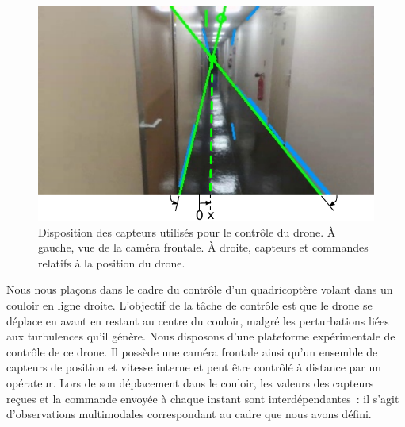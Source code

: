 \documentclass[../main]{subfiles}
\begin{document}
\begin{figure}
	\centering\includegraphics[width=\textwidth]{visudrone.pdf}
	\caption{Disposition des capteurs utilisés pour le contrôle du drone. \`A gauche, vue de la caméra frontale. \`A droite, capteurs et commandes relatifs à la position du drone.}
	\label{fig:drone}
	\end{figure}

Nous nous plaçons dans le cadre du contrôle d'un quadricoptère volant dans un couloir en ligne droite.
L'objectif de la tâche de contrôle est que le drone se déplace en avant en restant au centre du couloir, malgré les perturbations liées aux turbulences qu'il génère.
Nous disposons d'une plateforme expérimentale de contrôle de ce drone. Il possède une caméra frontale ainsi qu'un ensemble de capteurs de position et vitesse interne et peut être contrôlé à distance par un opérateur.
Lors de son déplacement dans le couloir, les valeurs des capteurs reçues et la commande envoyée à chaque instant sont interdépendantes~: il s'agit d'observations multimodales correspondant au cadre que nous avons défini.
\end{document}
